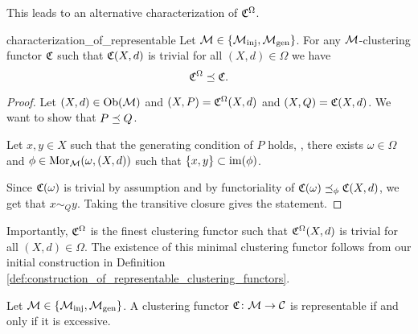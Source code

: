 This leads to an alternative characterization of $\mathfrak{C}^\Omega$.

\begin{proposition}{}{characterization_of_representable}
Let $\mathcal{M} \in \{{\mathcal{M}_\mathrm{inj}}, {\mathcal{M}_\mathrm{gen}}\}$. For any $\mathcal{M}$-clustering functor $\mathfrak{C}$ such that $\mathfrak{C}(X,d)$ is trivial for all $(X,d) \in \Omega$ we have
$$
\mathfrak{C}^\Omega \preceq \mathfrak{C}.
$$
\end{proposition}

\begin{proof}
Let $(X,d) \in \mathrm {Ob}(\mathcal{M})$ and $(X,P) = \mathfrak{C}^\Omega(X,d)$ and $(X,Q) = \mathfrak{C}(X,d)$. We want to show that $P \preceq Q$.

Let $x,y \in X$ such that the generating condition of $P$ holds, \ie, there exists $\omega \in \Omega$ and $\phi \in \mathrm {Mor}_{\mathcal{M}}(\omega, (X,d))$ such that $\{x,y\} \subset \operatorname*{im}(\phi)$.

Since $\mathfrak{C}(\omega)$ is trivial by assumption and by functoriality of $\mathfrak{C}(\omega) \preceq_\phi \mathfrak{C}(X,d)$, we get that $x \sim_Q y$. Taking the transitive closure gives the statement.

\end{proof}

Importantly, $\mathfrak{C}^\Omega$ is the finest clustering functor such that $\mathfrak{C}^\Omega(X,d)$ is trivial for all $(X,d) \in \Omega$. The existence of this minimal clustering functor follows from our initial construction in Definition \ref{def:construction_of_representable_clustering_functors}.

\begin{theorem}{\cite[Thm.~6.2]{Carlsson2010}}{}
Let $\mathcal{M} \in \{{\mathcal{M}_\mathrm{inj}}, {\mathcal{M}_\mathrm{gen}}\}$. A clustering functor $\mathfrak{C}\colon \mathcal{M} \to \mathcal{C}$ is representable if and only if it is excessive.
\end{theorem}

